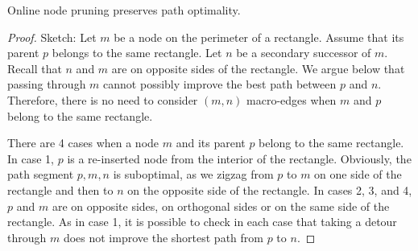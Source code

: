 \begin{lemma}
Online node pruning preserves path optimality.
\end{lemma}
\begin{proof}
Sketch: Let $m$ be a node on the perimeter of a rectangle. Assume that its
parent $p$ belongs to the same rectangle.  Let $n$ be a secondary successor of
$m$.  Recall that $n$ and $m$ are on opposite sides of the rectangle.  We argue
below that passing through $m$ cannot possibly improve the best path between $p$
and $n$.  Therefore, there is no need to consider $(m,n)$ macro-edges when $m$
and $p$ belong to the same rectangle.

There are 4 cases when a node $m$ and its parent $p$ belong to the same
rectangle. In case 1, $p$ is a re-inserted node from the interior of the
rectangle.  Obviously, the path segment $p,m,n$ is suboptimal, as we zigzag from
$p$ to $m$ on one side of the rectangle and then to $n$ on the opposite side of
the rectangle.  In cases 2, 3, and 4, $p$ and $m$ are on opposite sides, on
orthogonal sides or on the same side of the rectangle. As in case 1, it is
possible to check in each case that taking a detour through $m$ does not improve
the shortest path from $p$ to $n$.
\end{proof}




